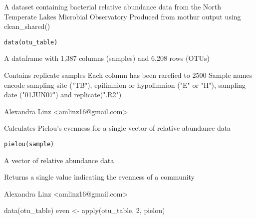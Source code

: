 \documentclass[a4paper]{book}
\begin{document}
%
\begin{Description}\relax
A dataset containing bacterial relative abundance data from the North Temperate Lakes Microbial Observatory
Produced from mothur output using clean\_shared()
\end{Description}
%
\begin{Usage}
\begin{verbatim}
data(otu_table)
\end{verbatim}
\end{Usage}
%
\begin{Format}
A dataframe with 1,387 columns (samples) and 6,208 rows	(OTUs)
\end{Format}
%
\begin{Details}\relax
Contains replicate samples
Each column has been rarefied to 2500
Sample names encode sampling site ("TB"), epilimnion or hypolimnion ("E" or "H"), sampling date ("01JUN07") and replicate(".R2")
\end{Details}
%
\begin{Author}\relax
Alexandra Linz <amlinz16@gmail.com>
\end{Author}
%
\begin{Description}\relax
Calculates Pielou's evenness for a single vector of relative abundance data
\end{Description}
%
\begin{Usage}
\begin{verbatim}
pielou(sample)
\end{verbatim}
\end{Usage}
%
\begin{Arguments}
\begin{ldescription}
\item[\code{sample}] 
A vector of relative abundance data

\end{ldescription}
\end{Arguments}
%
\begin{Value}
Returns a single value indicating the evenness of a community
\end{Value}
%
\begin{Author}\relax
Alexandra Linz <amlinz16@gmail.com>
\end{Author}
%
\begin{Examples}
\begin{ExampleCode}
data(otu_table)
even <- apply(otu_table, 2, pielou)

\end{ExampleCode}
\end{Examples}
\end{document}
